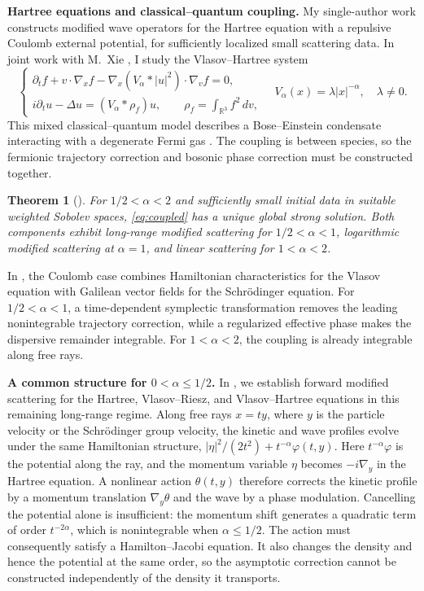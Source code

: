 \documentclass[10pt,reqno]{amsart}
\newtheorem{theorem}{Theorem}
\newcommand{\pr}{\partial}
\newcommand{\R}{\mathbb R}
\begin{document}
\smallskip
\noindent\textbf{Hartree equations and classical--quantum coupling.}
My single-author work \cite{H24a} constructs modified wave operators for the Hartree equation with a repulsive Coulomb external potential, for sufficiently localized small scattering data. In joint work with M.~Xie \cite{HX26a,HX26b}, I study the Vlasov--Hartree system
\begin{equation}\label{eq:coupled}
\begin{cases}
\pr_t f+v\cdot\nabla_x f-\nabla_x(V_\alpha*|u|^2)\cdot\nabla_vf=0,\\
i\pr_tu-\Delta u=(V_\alpha*\rho_f)u,\qquad \rho_f=\displaystyle\int_{\R^3}f^2\,dv,
\end{cases}
\quad V_\alpha(x)=\lambda|x|^{-\alpha},\quad \lambda\neq0.
\end{equation}
This mixed classical--quantum model describes a Bose--Einstein condensate interacting with a degenerate Fermi gas \cite{CMP23}. The coupling is between species, so the fermionic trajectory correction and bosonic phase correction must be constructed together.
\begin{theorem}[\cite{HX26a}]\label{thm:coupled}
For $1/2<\alpha<2$ and sufficiently small initial data in suitable weighted Sobolev spaces, \eqref{eq:coupled} has a unique global strong solution. Both components exhibit long-range modified scattering for $1/2<\alpha<1$, logarithmic modified scattering at $\alpha=1$, and linear scattering for $1<\alpha<2$.
\end{theorem}
In \cite{HX26a}, the Coulomb case combines Hamiltonian characteristics for the Vlasov equation with Galilean vector fields for the Schr\"odinger equation. For $1/2<\alpha<1$, a time-dependent symplectic transformation removes the leading nonintegrable trajectory correction, while a regularized effective phase makes the dispersive remainder integrable. For $1<\alpha<2$, the coupling is already integrable along free rays.

\smallskip
\noindent\textbf{A common structure for $0<\alpha\leq1/2$.}
In \cite{HX26b}, we establish forward modified scattering for the Hartree, Vlasov--Riesz, and Vlasov--Hartree equations in this remaining long-range regime. Along free rays $x=ty$, where $y$ is the particle velocity or the Schr\"odinger group velocity, the kinetic and wave profiles evolve under the same Hamiltonian structure, $|\eta|^2/(2t^2)+t^{-\alpha}\varphi(t,y)$. Here $t^{-\alpha}\varphi$ is the potential along the ray, and the momentum variable $\eta$ becomes $-i\nabla_y$ in the Hartree equation. A nonlinear action $\theta(t,y)$ therefore corrects the kinetic profile by a momentum translation $\nabla_y\theta$ and the wave by a phase modulation. Cancelling the potential alone is insufficient: the momentum shift generates a quadratic term of order $t^{-2\alpha}$, which is nonintegrable when $\alpha\leq1/2$. The action must consequently satisfy a Hamilton--Jacobi equation. It also changes the density and hence the potential at the same order, so the asymptotic correction cannot be constructed independently of the density it transports.
\end{document}
